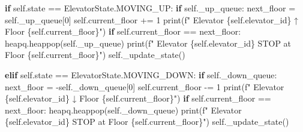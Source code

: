 \documentclass[11pt]{article}
\newenvironment{Shaded}{\begin{snugshade}}{\end{snugshade}}
\newcommand{\BuiltInTok}[1]{\textcolor[rgb]{0.50,0.55,0.55}{#1}}
\newcommand{\ControlFlowTok}[1]{\textcolor[rgb]{0.99,0.74,0.29}{\textbf{#1}}}
\newcommand{\DecValTok}[1]{\textcolor[rgb]{0.96,0.45,0.00}{#1}}
\newcommand{\NormalTok}[1]{\textcolor[rgb]{0.81,0.81,0.76}{#1}}
\newcommand{\OperatorTok}[1]{\textcolor[rgb]{0.81,0.81,0.76}{#1}}
\newcommand{\SpecialCharTok}[1]{\textcolor[rgb]{0.24,0.68,0.91}{#1}}
\newcommand{\SpecialStringTok}[1]{\textcolor[rgb]{0.85,0.27,0.33}{#1}}
\newcommand{\VariableTok}[1]{\textcolor[rgb]{0.15,0.68,0.68}{#1}}
\begin{document}
\begin{Shaded}
\begin{Highlighting}[]
        \ControlFlowTok{if} \VariableTok{self}\NormalTok{.state }\OperatorTok{==}\NormalTok{ ElevatorState.MOVING\_UP:}
            \ControlFlowTok{if} \VariableTok{self}\NormalTok{.\_up\_queue:}
\NormalTok{                next\_floor }\OperatorTok{=} \VariableTok{self}\NormalTok{.\_up\_queue[}\DecValTok{0}\NormalTok{]}
                \VariableTok{self}\NormalTok{.current\_floor }\OperatorTok{+=} \DecValTok{1}
                \BuiltInTok{print}\NormalTok{(}\SpecialStringTok{f"  Elevator }\SpecialCharTok{\{}\VariableTok{self}\SpecialCharTok{.}\NormalTok{elevator\_id}\SpecialCharTok{\}}\SpecialStringTok{ ↑ Floor }\SpecialCharTok{\{}\VariableTok{self}\SpecialCharTok{.}\NormalTok{current\_floor}\SpecialCharTok{\}}\SpecialStringTok{"}\NormalTok{)}
                \ControlFlowTok{if} \VariableTok{self}\NormalTok{.current\_floor }\OperatorTok{==}\NormalTok{ next\_floor:}
\NormalTok{                    heapq.heappop(}\VariableTok{self}\NormalTok{.\_up\_queue)}
                    \BuiltInTok{print}\NormalTok{(}\SpecialStringTok{f"  Elevator }\SpecialCharTok{\{}\VariableTok{self}\SpecialCharTok{.}\NormalTok{elevator\_id}\SpecialCharTok{\}}\SpecialStringTok{ STOP at Floor }\SpecialCharTok{\{}\VariableTok{self}\SpecialCharTok{.}\NormalTok{current\_floor}\SpecialCharTok{\}}\SpecialStringTok{"}\NormalTok{)}
            \VariableTok{self}\NormalTok{.\_update\_state()}

        \ControlFlowTok{elif} \VariableTok{self}\NormalTok{.state }\OperatorTok{==}\NormalTok{ ElevatorState.MOVING\_DOWN:}
            \ControlFlowTok{if} \VariableTok{self}\NormalTok{.\_down\_queue:}
\NormalTok{                next\_floor }\OperatorTok{=} \OperatorTok{{-}}\VariableTok{self}\NormalTok{.\_down\_queue[}\DecValTok{0}\NormalTok{]}
                \VariableTok{self}\NormalTok{.current\_floor }\OperatorTok{{-}=} \DecValTok{1}
                \BuiltInTok{print}\NormalTok{(}\SpecialStringTok{f"  Elevator }\SpecialCharTok{\{}\VariableTok{self}\SpecialCharTok{.}\NormalTok{elevator\_id}\SpecialCharTok{\}}\SpecialStringTok{ ↓ Floor }\SpecialCharTok{\{}\VariableTok{self}\SpecialCharTok{.}\NormalTok{current\_floor}\SpecialCharTok{\}}\SpecialStringTok{"}\NormalTok{)}
                \ControlFlowTok{if} \VariableTok{self}\NormalTok{.current\_floor }\OperatorTok{==}\NormalTok{ next\_floor:}
\NormalTok{                    heapq.heappop(}\VariableTok{self}\NormalTok{.\_down\_queue)}
                    \BuiltInTok{print}\NormalTok{(}\SpecialStringTok{f"  Elevator }\SpecialCharTok{\{}\VariableTok{self}\SpecialCharTok{.}\NormalTok{elevator\_id}\SpecialCharTok{\}}\SpecialStringTok{ STOP at Floor }\SpecialCharTok{\{}\VariableTok{self}\SpecialCharTok{.}\NormalTok{current\_floor}\SpecialCharTok{\}}\SpecialStringTok{"}\NormalTok{)}
            \VariableTok{self}\NormalTok{.\_update\_state()}


\end{Highlighting}
\end{Shaded}
\end{document}
